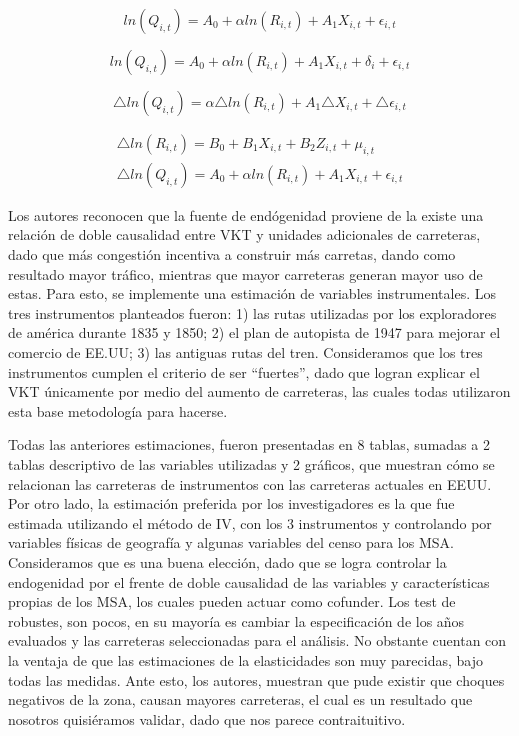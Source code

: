 \documentclass[
]{article}
\begin{document}
\begin{equation}
    ln(Q_{i,t})= A_0 + \alpha ln(R_{i,t})+ A_1 X_{i,t}+ \epsilon_{i,t}
\end{equation}

\begin{equation}
    ln(Q_{i,t})= A_0 + \alpha ln(R_{i,t})+ A_1 X_{i,t}+ \delta_i +\epsilon_{i,t}
\end{equation}

\begin{equation}
    \triangle ln(Q_{i,t})=  \alpha \triangle ln(R_{i,t})+ A_1 \triangle X_{i,t}+ \triangle \epsilon_{i,t}
\end{equation}

\begin{align}
\triangle ln(R_{i,t})=  B_0 + B_1 X_{i,t} + B_2 Z_{i,t}+ \mu_{i,t} \\
\triangle ln(Q_{i,t})=  A_0 + \alpha ln(R_{i,t})+ A_1 X_{i,t}+ \epsilon_{i,t}
\end{align}

Los autores reconocen que la fuente de endógenidad proviene de la existe
una relación de doble causalidad entre VKT y unidades adicionales de
carreteras, dado que más congestión incentiva a construir más carretas,
dando como resultado mayor tráfico, mientras que mayor carreteras
generan mayor uso de estas. Para esto, se implemente una estimación de
variables instrumentales. Los tres instrumentos planteados fueron: 1)
las rutas utilizadas por los exploradores de américa durante 1835 y
1850; 2) el plan de autopista de 1947 para mejorar el comercio de EE.UU;
3) las antiguas rutas del tren. Consideramos que los tres instrumentos
cumplen el criterio de ser ``fuertes'', dado que logran explicar el VKT
únicamente por medio del aumento de carreteras, las cuales todas
utilizaron esta base metodología para hacerse.

Todas las anteriores estimaciones, fueron presentadas en 8 tablas,
sumadas a 2 tablas descriptivo de las variables utilizadas y 2 gráficos,
que muestran cómo se relacionan las carreteras de instrumentos con las
carreteras actuales en EEUU. Por otro lado, la estimación preferida por
los investigadores es la que fue estimada utilizando el método de IV,
con los 3 instrumentos y controlando por variables físicas de geografía
y algunas variables del censo para los MSA. Consideramos que es una
buena elección, dado que se logra controlar la endogenidad por el frente
de doble causalidad de las variables y características propias de los
MSA, los cuales pueden actuar como cofunder. Los test de robustes, son
pocos, en su mayoría es cambiar la especificación de los años evaluados
y las carreteras seleccionadas para el análisis. No obstante cuentan con
la ventaja de que las estimaciones de la elasticidades son muy
parecidas, bajo todas las medidas. Ante esto, los autores, muestran que
pude existir que choques negativos de la zona, causan mayores
carreteras, el cual es un resultado que nosotros quisiéramos validar,
dado que nos parece contraituitivo.
\end{document}
